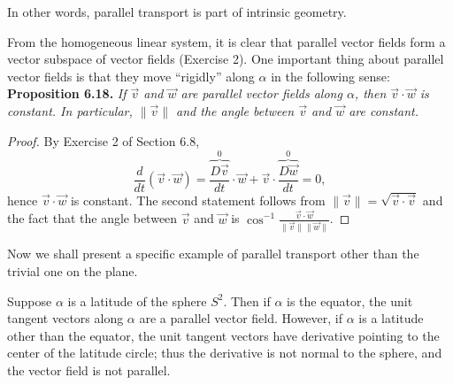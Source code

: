 \documentclass[leqno]{book}
\begin{document}
\noindent In other words, parallel transport is part of intrinsic geometry.

From the homogeneous linear system, it is clear that parallel vector fields form a vector subspace of vector fields (Exercise 2).  One important thing about parallel vector fields is that they move ``rigidly'' along $\alpha$ in the following sense:\\

\noindent\textbf{Proposition 6.18.} \emph{If $\vec v$ and $\vec w$ are parallel vector fields along $\alpha$, then $\vec v\cdot\vec w$ is constant.  In particular, $\|\vec v\|$ and the angle between $\vec v$ and $\vec w$ are constant.}
\begin{proof}
By Exercise 2 of Section 6.8,
$$\frac{d}{dt}(\vec v\cdot\vec w)=\overset 0{\overbrace{\frac{D\vec v}{dt}}}\cdot\vec w+\vec v\cdot\overset 0{\overbrace{\frac{D\vec w}{dt}}}=0,$$
hence $\vec v\cdot\vec w$ is constant.  The second statement follows from $\|\vec v\|=\sqrt{\vec v\cdot\vec v}$ and the fact that the angle between $\vec v$ and $\vec w$ is $\cos^{-1}\frac{\vec v\cdot\vec w}{\|\vec v\|\|\vec w\|}$.
\end{proof}

\noindent Now we shall present a specific example of parallel transport other than the trivial one on the plane.

Suppose $\alpha$ is a latitude of the sphere $S^2$.  Then if $\alpha$ is the equator, the unit tangent vectors along $\alpha$ are a parallel vector field.  However, if $\alpha$ is a latitude other than the equator, the unit tangent vectors have derivative pointing to the center of the latitude circle; thus the derivative is not normal to the sphere, and the vector field is not parallel.
\end{document}
